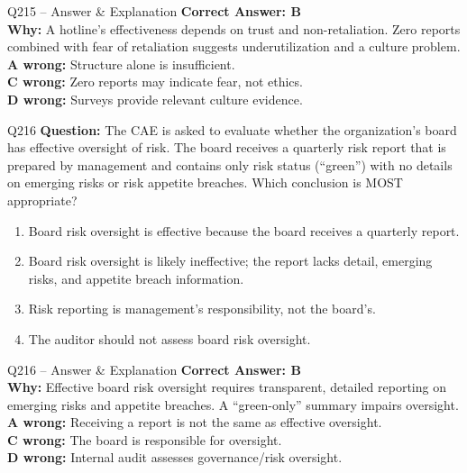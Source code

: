 \documentclass[aspectratio=169,10pt]{beamer}
\begin{document}
	\begin{frame}[t]{Q215 -- Answer \& Explanation}
		\small
		\textbf{Correct Answer: B} \\[4pt]
		\textbf{Why:} A hotline's effectiveness depends on trust and non-retaliation. Zero reports combined with fear of retaliation suggests underutilization and a culture problem. \\[4pt]
		\textbf{A wrong:} Structure alone is insufficient. \\[2pt]
		\textbf{C wrong:} Zero reports may indicate fear, not ethics. \\[2pt]
		\textbf{D wrong:} Surveys provide relevant culture evidence.
	\end{frame}
	
	\begin{frame}[t]{Q216}
		\small
		\textbf{Question:} The CAE is asked to evaluate whether the organization's board has effective oversight of risk. The board receives a quarterly risk report that is prepared by management and contains only risk status (``green'') with no details on emerging risks or risk appetite breaches. Which conclusion is MOST appropriate?
		\begin{enumerate}[label=\Alph*.,itemsep=1pt,topsep=2pt]
			\item Board risk oversight is effective because the board receives a quarterly report.
			\item Board risk oversight is likely ineffective; the report lacks detail, emerging risks, and appetite breach information.
			\item Risk reporting is management's responsibility, not the board's.
			\item The auditor should not assess board risk oversight.
		\end{enumerate}
	\end{frame}
	
	\begin{frame}[t]{Q216 -- Answer \& Explanation}
		\small
		\textbf{Correct Answer: B} \\[4pt]
		\textbf{Why:} Effective board risk oversight requires transparent, detailed reporting on emerging risks and appetite breaches. A ``green-only'' summary impairs oversight. \\[4pt]
		\textbf{A wrong:} Receiving a report is not the same as effective oversight. \\[2pt]
		\textbf{C wrong:} The board is responsible for oversight. \\[2pt]
		\textbf{D wrong:} Internal audit assesses governance/risk oversight.
	\end{frame}
	
\end{document}
